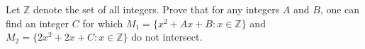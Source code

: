 Let $\mathbb{Z}$ denote the set of all integers. Prove that for any integers $A$ and $B$, one can find an integer $C$ for which $M_1 = \{x^2 + Ax + B : x \in \mathbb{Z}\}$ and $M_2 = \{2x^2 + 2x + C : x \in \mathbb{Z}\}$ do not intersect.
